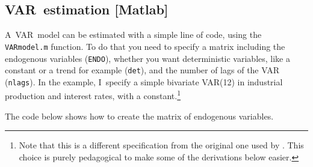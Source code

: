 \documentclass[10pt]{article}
\begin{document}
\subsection{VAR\ estimation {\color{note} {\protect\small {[Matlab]}}}}

A\ VAR\ model can be estimated with a simple line of code, using the \texttt{%
VARmodel.m} function. To do that you need to specify a matrix including the
endogenous variables (\texttt{ENDO}), whether you want deterministic
variables, like a constant or a trend for example (\texttt{det}), and the
number of lags of the VAR (\texttt{nlags}). In the example, I\ specify a
simple bivariate VAR(12) in industrial production and interest rates, with a
constant.\footnote{%
Note that this is a different specification from the original one used by 
\cite{GertlerKaradi2015}. This choice is purely pedagogical to make some of
the derivations below easier.} 

The code below shows how to create the matrix of endogenous variables.

\end{document}
